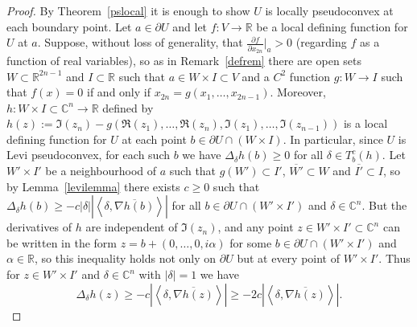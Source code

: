 \documentclass[11pt,a4paper, final, twoside]{article}
\numberwithin{equation}{section}
\newcommand{\C}{\mathbb C}
\newcommand{\R}{\mathbb R}
\newcommand{\con}[1]{\overline{#1}}
\newcommand{\pd}[2]{\frac{\partial #1}{\partial #2}}
\newcommand{\clos}[1]{\overline{#1}}
\newcommand{\bd}{\partial}
\newcommand{\cts}{C}
\renewcommand{\sp}[2]{\left<#1,#2\right>}
\newcommand{\sprod}[2]{\sp{#1}{#2}}
\newcommand{\cgrad}[1]{\nabla #1}
\begin{document}
\begin{proof}
By Theorem~\ref{pslocal} it is enough to show $U$ is locally pseudoconvex at each boundary point. 
Let $a\in\bd U$ and let $f\colon V\to\R$ be a local defining function for $U$ at $a$. 
Suppose, without loss of generality, that $\pd{f}{x_{2n}}\big|_a>0$ (regarding $f$ as a function of real variables), so as in Remark~\ref{defrem} 
there are open sets $W\subset\R^{2n-1}$ and $I\subset\R$ such that $a\in W\times I\subset V$ and a $\cts^2$ function $g\colon W\to I$ such that
$f(x)=0$ if and only if $x_{2n}=g(x_1,\dots,x_{2n-1})$. Moreover, $h\colon W\times I\subset\C^n\to\R$ defined by $h(z):=\Im(z_n)-g(\Re(z_1),\dots,\Re(z_n),\Im(z_1),\dots,\Im(z_{n-1}))$ 
is a local defining function for $U$ at each point $b\in\bd U\cap(W\times I)$.
In particular, since $U$ is Levi pseudoconvex,
for each such $b$ we have $\Delta_\delta h(b)\geq 0$ for all $\delta\in T^c_b(h)$. Let $W'\times I'$ be a neighbourhood of $a$ such that $g(W')\subset I'$,
$\clos{W'}\subset W$ and $\clos{I'}\subset I$,
so by Lemma~\ref{levilemma} there exists $c\geq 0$ such that $\Delta_{\delta}h(b)\geq -c|\delta|\left|\sprod{\delta}{\con{\cgrad{h}(b)}}\right|$ for all $b\in \bd U\cap (W'\times I')$ and
$\delta\in\C^n$. But the derivatives of $h$ are independent of $\Im(z_n)$, and any point $z\in W'\times I'\subset\C^n$ can be written in the form $z=b+(0,\dots,0,i\alpha)$ for some
$b\in \bd U\cap(W'\times I')$ and $\alpha\in\R$, 
so this inequality holds not only on $\bd U$ but at every point of $W'\times I'$. Thus for $z\in W'\times I'$ and $\delta\in\C^n$ with $|\delta|=1$
we have
\begin{equation} \Delta_\delta h(z)\geq -c\left|\sprod{\delta}{\con{\cgrad{h}(z)}}\right|\geq -2c\left|\sprod{\delta}{\con{\cgrad{h}(z)}}\right|.\label{levipseq}\end{equation}


\end{proof}
\end{document}
